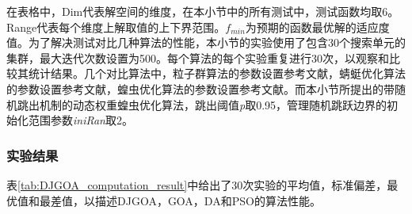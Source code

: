 在表格中，Dim代表解空间的维度，在本小节中的所有测试中，测试函数均取6。Range代表每个维度上解取值的上下界范围。$f_{min}$为预期的函数最优解的适应度值。为了解决测试对比几种算法的性能，本小节的实验使用了包含30个搜索单元的集群，最大迭代次数设置为500。每个算法的每个实验重复进行30次，以观察和比较其统计结果。几个对比算法中，粒子群算法的参数设置参考文献\cite{kennedy1995particle}，蜻蜓优化算法的参数设置参考文献\cite{mirjalili2016dragonfly}，蝗虫优化算法的参数设置参考文献\cite{saremi2017grasshopper}。而本小节所提出的带随机跳出机制的动态权重蝗虫优化算法，跳出阈值\emph{p}取0.95，管理随机跳跃边界的初始化范围参数\emph{iniRan}取2。


\subsubsection{实验结果}
表\ref{tab:DJGOA_computation_result}中给出了30次实验的平均值，标准偏差，最优值和最差值，以描述DJGOA，GOA，DA和PSO的算法性能。

